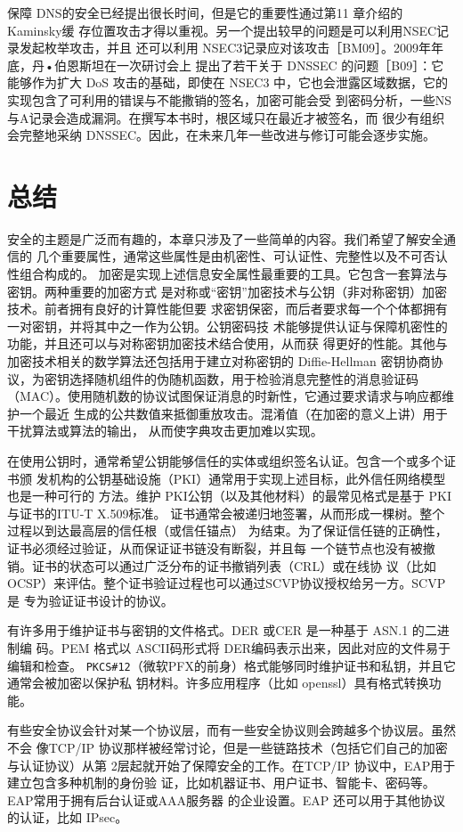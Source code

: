 保障 DNS的安全已经提出很长时间，但是它的重要性通过第11 章介绍的Kaminsky缓
存位置攻击才得以重视。另一个提出较早的问题是可以利用NSEC记录发起枚举攻击，并且
还可以利用 NSEC3记录应对该攻击［BM09］。2009年年底，丹•伯恩斯坦在一次研讨会上
提出了若干关于 DNSSEC 的问题［B09］：它能够作为扩大 DoS 攻击的基础，即使在 NSEC3
中，它也会泄露区域数据，它的实现包含了可利用的错误与不能撒销的签名，加密可能会受
到密码分析，一些NS与A记录会造成漏洞。在撰写本书时，根区域只在最近才被签名，而
很少有组织会完整地采纳 DNSSEC。因此，在未来几年一些改进与修订可能会逐步实施。

\section{总结}
安全的主题是广泛而有趣的，本章只涉及了一些简单的内容。我们希望了解安全通信的
几个重要属性，通常这些属性是由机密性、可认证性、完整性以及不可否认性组合构成的。
加密是实现上述信息安全属性最重要的工具。它包含一套算法与密钥。两种重要的加密方式
是对称或“密钥”加密技术与公钥（非对称密钥）加密技术。前者拥有良好的计算性能但要
求密钥保密，而后者要求每一个个体都拥有一对密钥，并将其中之一作为公钥。公钥密码技
术能够提供认证与保障机密性的功能，并且还可以与对称密钥加密技术结合使用，从而获
得更好的性能。其他与加密技术相关的数学算法还包括用于建立对称密钥的 Diffie-Hellman
密钥协商协议，为密钥选择随机组件的伪随机函数，用于检验消息完整性的消息验证码
（MAC）。使用随机数的协议试图保证消息的时新性，它通过要求请求与响应都维护一个最近
生成的公共数值来抵御重放攻击。混淆值（在加密的意义上讲）用于干扰算法或算法的输出，
从而使字典攻击更加难以实现。

在使用公钥时，通常希望公钥能够信任的实体或组织签名认证。包含一个或多个证书颁
发机构的公钥基础设施（PKI）通常用于实现上述目标，此外信任网络模型也是一种可行的
方法。维护 PKI公钥（以及其他材料）的最常见格式是基于 PKI与证书的ITU-T X.509标准。
证书通常会被递归地签署，从而形成一棵树。整个过程以到达最高层的信任根（或信任锚点）
为结束。为了保证信任链的正确性，证书必须经过验证，从而保证证书链没有断裂，并且每
一个链节点也没有被撤销。证书的状态可以通过广泛分布的证书撤销列表（CRL）或在线协
议（比如 OCSP）来评估。整个证书验证过程也可以通过SCVP协议授权给另一方。SCVP是
专为验证证书设计的协议。

有许多用于维护证书与密钥的文件格式。DER 或CER 是一种基于 ASN.1 的二进制编
码。PEM 格式以 ASCII码形式将 DER编码表示出来，因此对应的文件易于编辑和检查。
\verb|PKCS#12|（微软PFX的前身）格式能够同时维护证书和私钥，并且它通常会被加密以保护私
钥材料。许多应用程序（比如 openssl）具有格式转换功能。

有些安全协议会针对某一个协议层，而有一些安全协议则会跨越多个协议层。虽然不会
像TCP/IP 协议那样被经常讨论，但是一些链路技术（包括它们自己的加密与认证协议）从第
2层起就开始了保障安全的工作。在TCP/IP 协议中，EAP用于建立包含多种机制的身份验
证，比如机器证书、用户证书、智能卡、密码等。EAP常用于拥有后台认证或AAA服务器
的企业设置。EAP 还可以用于其他协议的认证，比如 IPsec。

